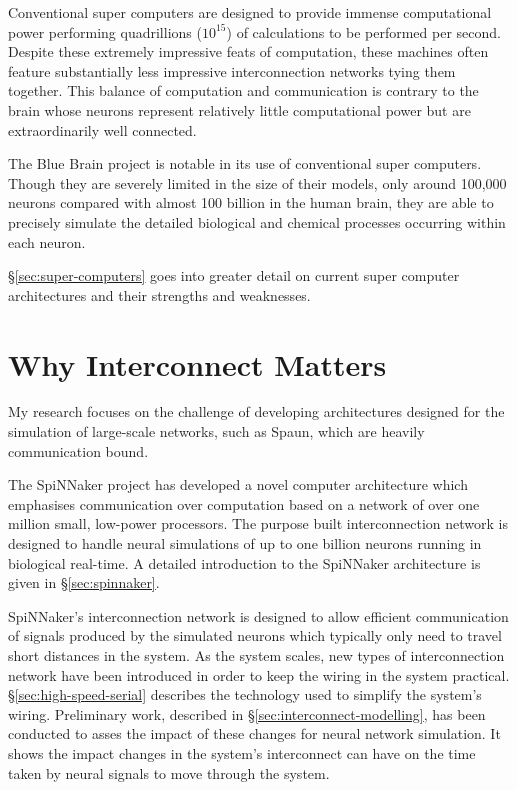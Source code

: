 		Conventional super computers are designed to provide immense computational
		power performing quadrillions ($10^{15}$) of calculations to be performed
		per second. Despite these extremely impressive feats of computation, these
		machines often feature substantially less impressive interconnection
		networks tying them together. This balance of computation and communication
		is contrary to the brain whose neurons represent relatively little
		computational power but are extraordinarily well connected.
		
		The Blue Brain project is notable in its use of conventional super
		computers. Though they are severely limited in the size of their models,
		only around 100,000 neurons compared with almost 100 billion in the human
		brain, they are able to precisely simulate the detailed biological and
		chemical processes occurring within each neuron.
		
		\S\ref{sec:super-computers} goes into greater detail on current super
		computer architectures and their strengths and weaknesses.
	
	\section{Why Interconnect Matters}
		
		My research focuses on the challenge of developing architectures designed
		for the simulation of large-scale networks, such as Spaun, which are heavily
		communication bound.
		
		The SpiNNaker project \cite{furber06} has developed a novel computer
		architecture which emphasises communication over computation based on a
		network of over one million small, low-power processors. The purpose built
		interconnection network is designed to handle neural simulations of up to
		one billion neurons running in biological real-time. A detailed introduction
		to the SpiNNaker architecture is given in \S\ref{sec:spinnaker}.
		
		SpiNNaker's interconnection network is designed to allow efficient
		communication of signals produced by the simulated neurons which typically
		only need to travel short distances in the system. As the system scales, new
		types of interconnection network have been introduced in order to keep the
		wiring in the system practical. \S\ref{sec:high-speed-serial} describes the
		technology used to simplify the system's wiring. Preliminary work, described
		in \S\ref{sec:interconnect-modelling}, has been conducted to asses the
		impact of these changes for neural network simulation. It shows the impact
		changes in the system's interconnect can have on the time taken by neural
		signals to move through the system.
		
